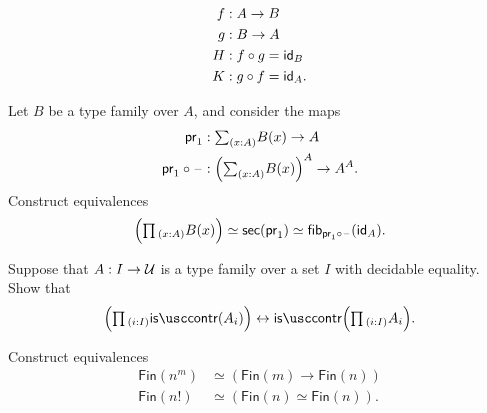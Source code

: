 \begin{exercises}
\begin{align*}
f & : A\to B \\
g & : B\to A \\
H & : f\circ g = \idfunc[B] \\
K & : g\circ f = \idfunc[A].
\end{align*}
\item \label{ex:pi_sec}Let $B$ be a type family over $A$, and consider the maps
  \begin{align*}
    \proj 1 & : \sm{x:A} B(x)\to A \\
    \proj1 \circ \blank & : \Big(\sm{x:A} B(x)\Big)^A \to A^A.
  \end{align*}
  Construct equivalences
  \begin{equation*}
    \Big(\prd{x:A}B(x)\Big) \eqvsym \mathsf{sec}(\proj 1) \eqvsym \fib{\proj 1 \circ\blank}{\idfunc[A]}.
  \end{equation*}
\item Suppose that $A:I\to \UU$ is a type family over a set $I$ with decidable equality. Show that
  \begin{equation*}
    \Big(\prd{i:I}\iscontr(A_i)\Big)\leftrightarrow \iscontr\Big(\prd{i:I}A_i\Big).
  \end{equation*}
\item Construct equivalences
  \begin{align*}
    \mathsf{Fin}(n^m) & \simeq (\mathsf{Fin}(m)\to\mathsf{Fin}(n)) \\
    \mathsf{Fin}(n!) & \simeq (\mathsf{Fin}(n)\simeq\mathsf{Fin}(n)).
  \end{align*}
\end{exercises}

